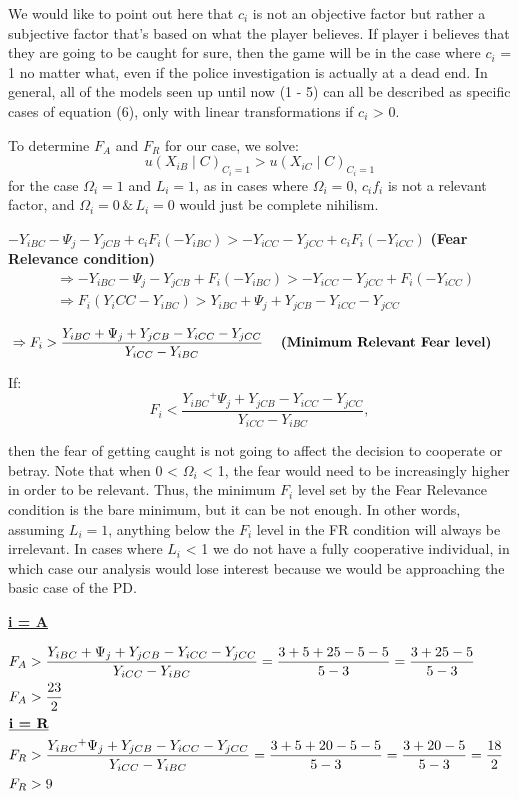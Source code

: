 \documentclass[11pt, a4paper]{article}
\begin{document}
We would like to point out here that $c_i$ is not an objective factor but rather a subjective factor that's based on what the player believes. If player i believes that they are going to be
caught for sure, then the game will be in the case where $c_i$ = 1 no matter what, even if the police investigation is actually at a dead end.
In general, all of the models seen up until now (1 - 5) can all be described as specific cases of equation (6), only with linear transformations if $c_i$ > 0.

To determine $F_A$ and $F_R$ for our case, we solve:
$$
u\left(X_{i B} \mid C\right)_{C_i=1}>u\left(X_{i C} \mid C\right)_{C_i=1}
$$
for the case $\Omega_i=1$ and $L_i=1$, as in cases where $\Omega_i=0$, $c_i f_i$ is not a relevant factor, and $\Omega_i=0 \, \& \,  L_i=0$ would just be complete nihilism.

$-Y_{i B C}-\Psi_j-Y_{j C B}+c_i F_i\left(-Y_{i B C}\right)>-Y_{i C C}-Y_{j C C}+c_i F_i\left(-Y_{i C C}\right)$   \textbf{(Fear Relevance condition)}
$$
\begin{aligned}
& \Rightarrow-Y_{i B C}-\Psi_j-Y_{j C B}+F_i\left(-Y_{i B C}\right)>-Y_{i C C}-Y_{j C C}+F_i\left(-Y_{i C C}\right) \\
& \Rightarrow F_i\left(Y_i C C-Y_{i B C}\right)>Y_{i B C}+\Psi_j+Y_{j C B}-Y_{i C C}-Y_{j C C}
\end{aligned}
$$

$$
\begin{aligned}
& \Rightarrow F_i>\frac{Y_{i B C}+\Psi_j+Y_{j C B}-Y_{i C C}-Y_{j C C}}{Y_{i C C}-Y_{i B C}} \quad \text { \textbf{(Minimum Relevant Fear level) }}
\end{aligned}
$$

If:
$$
F_i<\frac{Y_{i B C}{ }^{+} \Psi_j+Y_{j C B}-Y_{i C C}-Y_{j C C}}{Y_{i C C}-Y_{i B C}},
$$

then the fear of getting caught is not going to affect the decision to cooperate or betray. Note that when 0 < $\Omega_i$ < 1, the fear would need to be increasingly higher in order to be relevant. Thus, the minimum $F_i$ level set by the Fear Relevance condition is the bare minimum, but it can be not enough. In other words, assuming $L_i = 1$, anything below the $F_i$ level in the FR condition will always be irrelevant. In cases where $L_i$ < 1 we do not have a fully cooperative individual, in which case our analysis would lose interest because we would be approaching the basic case of the PD.

\textbf{\underline{i = A}}

$\begin{aligned} & F_A>\frac{Y_{i B C}+\Psi_j+Y_{j C B}-Y_{i C C}-Y_{j C C}}{Y_{i C C}-Y_{i B C}}=\frac{3+5+25-5-5}{5-3}=\frac{3+25-5}{5-3} \\ & F_A>\frac{23}{2}  \\ & \text{\textbf{\underline{i = R}}} \\ & F_R>\frac{Y_{i B C}{ }^{+} \Psi_j+Y_{j C B}-Y_{i C C}-Y_{j C C}}{Y_{i C C}-Y_{i B C}}=\frac{3+5+20-5-5}{5-3}=\frac{3+20-5}{5-3}=\frac{18}{2} \\ & F_R>9 \\ & \end{aligned}$
\end{document}
